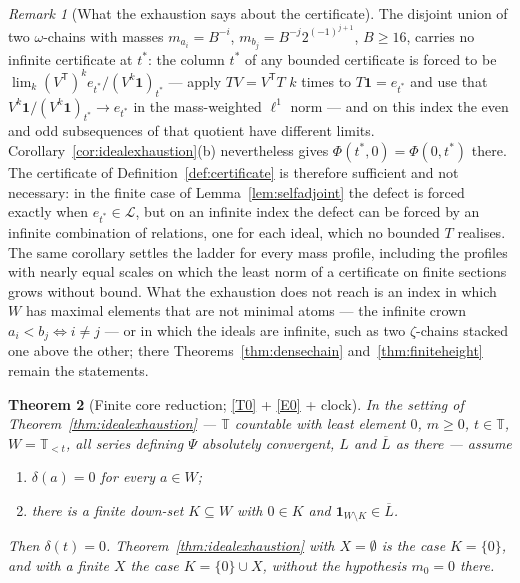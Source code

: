 \documentclass[11pt,a4paper]{article}
\theoremstyle{plain}
\newtheorem{theorem}{Theorem}[section]
\theoremstyle{definition}
\theoremstyle{remark}
\newtheorem{remark}[theorem]{Remark}
\newcommand{\T}{\mathbb{T}}                     %
\newcommand{\one}{\mathbf{1}}
\begin{document}
\begin{remark}[What the exhaustion says about the certificate]
  \label{rem:idealexhaustion}
  The disjoint union of two $\omega$-chains with masses $m_{a_i} = B^{-i}$,
  $m_{b_j} = B^{-j}2^{(-1)^{j+1}}$, $B \geq 16$, carries no infinite
  certificate at $t^*$: the column $t^*$ of any bounded certificate is forced
  to be $\lim_k (V^{\mathsf T})^k e_{t^*} / (V^k\one)_{t^*}$ --- apply
  $TV = V^{\mathsf T}T$ $k$ times to $T\one = e_{t^*}$ and use that
  $V^k\one/(V^k\one)_{t^*} \to e_{t^*}$ in the mass-weighted $\ell^1$ norm ---
  and on this index the even and odd subsequences of that quotient have
  different limits.  Corollary~\ref{cor:idealexhaustion}(b) nevertheless gives
  $\Phi(t^*,0) = \Phi(0,t^*)$ there.  The certificate of
  Definition~\ref{def:certificate} is therefore sufficient and not necessary:
  in the finite case of Lemma~\ref{lem:selfadjoint} the defect is forced
  exactly when $e_{t^*} \in \mathcal{L}$, but on an infinite index the defect
  can be forced by an infinite combination of relations, one for each ideal,
  which no bounded $T$ realises.  The same corollary settles the ladder for
  every mass profile, including the profiles with nearly equal scales on which
  the least norm of a certificate on finite sections grows without bound.  What
  the exhaustion does not reach is an index in which $W$ has maximal elements
  that are not minimal atoms --- the infinite crown $a_i < b_j \iff i \neq j$
  --- or in which the ideals are infinite, such as two $\zeta$-chains stacked
  one above the other; there Theorems~\ref{thm:densechain}
  and~\ref{thm:finiteheight} remain the statements.
\end{remark}

\begin{theorem}[Finite core reduction; \eqref{T0} + \eqref{E0} + clock]
  \label{thm:corereduction}
  In the setting of Theorem~\ref{thm:idealexhaustion} --- $\T$ countable with
  least element $0$, $m \geq 0$, $t \in \T$, $W = \T_{<t}$, all series defining
  $\Psi$ absolutely convergent, $L$ and $\overline{L}$ as there --- assume
  \begin{enumerate}[label=(\roman*)]
  \item $\delta(a) = 0$ for every $a \in W$;
  \item[(ii$'$)] there is a \emph{finite} down-set $K \subseteq W$ with
    $0 \in K$ and $\one_{W \setminus K} \in \overline{L}$.
  \end{enumerate}
  Then $\delta(t) = 0$.  Theorem~\ref{thm:idealexhaustion} with
  $X = \emptyset$ is the case $K = \{0\}$, and with a finite $X$ the case
  $K = \{0\} \cup X$, without the hypothesis $m_0 = 0$ there.
\end{theorem}
\end{document}
